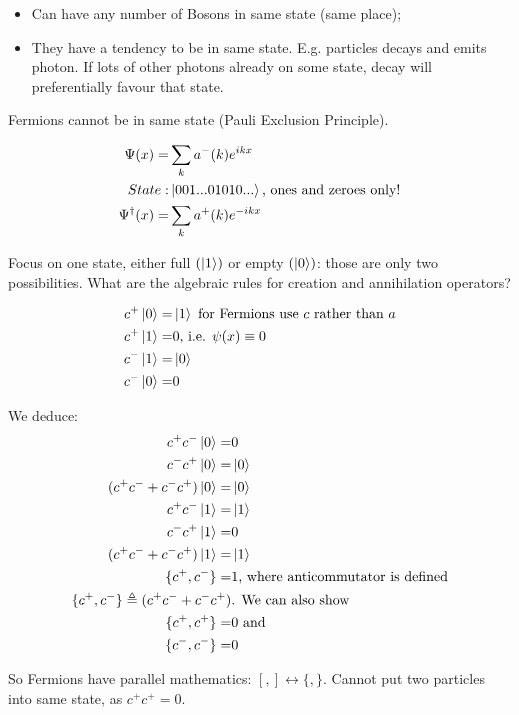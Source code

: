 \documentclass[]{article}
\begin{document}
\begin{itemize}
	\item Can have any number of Bosons in same state (same place);
	\item They have a tendency to be in same state. E.g. particles decays and emits photon. If lots of other photons already on some state, decay will preferentially favour that state.
\end{itemize}

Fermions cannot be in same state (Pauli Exclusion Principle).

\begin{align*}
\Psi(x) =& \sum_k a^-(k) e^{ikx}\\
State:& \ket{001...01010...} \text{, ones and zeroes only!}\\
\Psi^\dagger(x) =& \sum_k a^+(k) e^{-ikx}
\end{align*}

Focus on one state, either full $(\ket{1})$ or empty $(\ket{0})$: those are only two possibilities. What are the algebraic rules for creation and annihilation operators?

\begin{align*}
c^+\ket{0} =& \ket{1} \text{ for Fermions use $c$ rather than $a$}\\
c^+\ket{1} =& 0 \text{, i.e. $\psi(x) \equiv 0$}\\
c^-\ket{1} =& \ket{0}\\
c^-\ket{0} =& 0\\
\end{align*}

We deduce:
\begin{align*}
c^+c^-\ket{0} =& 0\\
c^-c^+\ket{0} =& \ket{0}\\
(c^+c^-+c^-c^+)\ket{0} =& \ket{0}\\
c^+c^-\ket{1} =& \ket{1} \\
c^-c^+\ket{1} =&0 \\
(c^+c^-+c^-c^+)\ket{1} =& \ket{1}\\
\{c^+,c^-\} =& 1 \text{, where anticommutator is defined}\\
\{c^+,c^-\} \triangleq(c^+c^-+c^-c^+)& \text{. We can also show}\\
\{c^+,c^+\} =&0 \text{ and}\\
\{c^-,c^-\} =&0
\end{align*}

So Fermions have parallel mathematics: $[,] \leftrightarrow \{,\}$. Cannot put two particles into same state, as $c^+c^+=0$.
\end{document}
